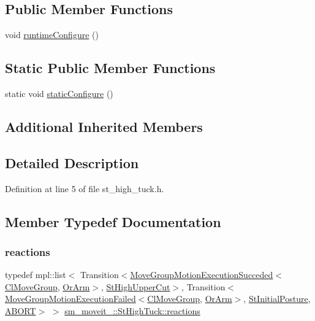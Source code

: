 \subsection*{Public Member Functions}
\begin{DoxyCompactItemize}
\item 
void \hyperlink{structsm__moveit__3_1_1StHighTuck_a9a247958dbc1a1ab3ef0a287f6688218}{runtime\+Configure} ()
\end{DoxyCompactItemize}
\subsection*{Static Public Member Functions}
\begin{DoxyCompactItemize}
\item 
static void \hyperlink{structsm__moveit__3_1_1StHighTuck_aec8c3461ff25307361fed9e292e2a00d}{static\+Configure} ()
\end{DoxyCompactItemize}
\subsection*{Additional Inherited Members}


\subsection{Detailed Description}


Definition at line 5 of file st\+\_\+high\+\_\+tuck.\+h.



\subsection{Member Typedef Documentation}
\mbox{\label{structsm__moveit__3_1_1StHighTuck_a26830b344af16cd0a5f59f72c125a289}} 
\subsubsection{\texorpdfstring{reactions}{reactions}}
{\footnotesize\ttfamily typedef mpl\+::list$<$ Transition$<$\hyperlink{structmoveit__z__client_1_1MoveGroupMotionExecutionSucceded}{Move\+Group\+Motion\+Execution\+Succeded}$<$\hyperlink{classmoveit__z__client_1_1ClMoveGroup}{Cl\+Move\+Group}, \hyperlink{classsm__moveit__3_1_1OrArm}{Or\+Arm}$>$, \hyperlink{structsm__moveit__3_1_1StHighUpperCut}{St\+High\+Upper\+Cut}$>$, Transition$<$\hyperlink{structmoveit__z__client_1_1MoveGroupMotionExecutionFailed}{Move\+Group\+Motion\+Execution\+Failed}$<$\hyperlink{classmoveit__z__client_1_1ClMoveGroup}{Cl\+Move\+Group}, \hyperlink{classsm__moveit__3_1_1OrArm}{Or\+Arm}$>$, \hyperlink{structsm__moveit__3_1_1StInitialPosture}{St\+Initial\+Posture}, \hyperlink{classABORT}{A\+B\+O\+RT}$>$ $>$ \hyperlink{structsm__moveit__3_1_1StHighTuck_a26830b344af16cd0a5f59f72c125a289}{sm\+\_\+moveit\+\_\+::\+St\+High\+Tuck\+::reactions}}



